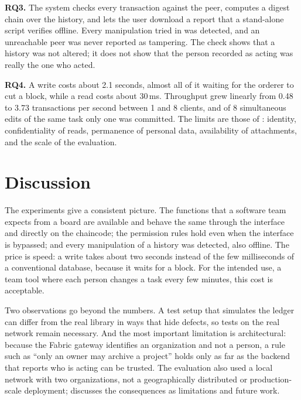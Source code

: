 \textbf{RQ3.} The system checks every transaction against the peer, computes a digest chain over the history, and lets the user download a report that a stand-alone script verifies offline. Every manipulation tried in  was detected, and an unreachable peer was never reported as tampering. The check shows that a history was not altered; it does not show that the person recorded as acting was really the one who acted.

\textbf{RQ4.} A write costs about 2.1 seconds, almost all of it waiting for the orderer to cut a block, while a read costs about 30\,ms. Throughput grew linearly from 0.48 to 3.73 transactions per second between 1 and 8 clients, and of 8 simultaneous edits of the same task only one was committed. The limits are those of : identity, confidentiality of reads, permanence of personal data, availability of attachments, and the scale of the evaluation.

\section{Discussion}
\label{sec:results-discussion}

The experiments give a consistent picture. The functions that a software team expects from a board are available and behave the same through the interface and directly on the chaincode; the permission rules hold even when the interface is bypassed; and every manipulation of a history was detected, also offline. The price is speed: a write takes about two seconds instead of the few milliseconds of a conventional database, because it waits for a block. For the intended use, a team tool where each person changes a task every few minutes, this cost is acceptable.

Two observations go beyond the numbers. A test setup that simulates the ledger can differ from the real library in ways that hide defects, so tests on the real network remain necessary. And the most important limitation is architectural: because the Fabric gateway identifies an organization and not a person, a rule such as ``only an owner may archive a project'' holds only as far as the backend that reports who is acting can be trusted. The evaluation also used a local network with two organizations, not a geographically distributed or production-scale deployment;  discusses the consequences as limitations and future work.
